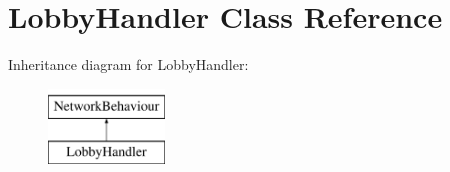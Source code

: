 \hypertarget{class_lobby_handler}{}\section{Lobby\+Handler Class Reference}
\label{class_lobby_handler}
Inheritance diagram for Lobby\+Handler\+:\begin{figure}[H]
\begin{center}
\leavevmode
\includegraphics[height=2.000000cm]{class_lobby_handler}
\end{center}
\end{figure}
